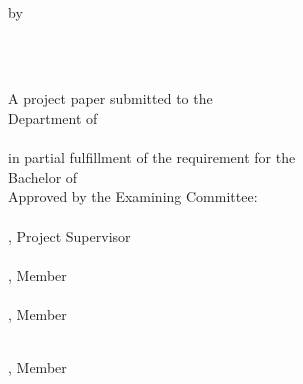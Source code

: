 \documentclass[a4paper]{memoir}
\begin{document}
\thispagestyle{empty}
\begin{LARGE}
\begin{center}

{\fontsize{16pt}{18pt}\selectfont
  \textbf{\myTitle}
}\\[24pt]

{\fontsize{14pt}{16pt}\selectfont
  by

  \vfill
  \myName\\[10pt]
  \MakeTextUppercase{\myMatric}\\

  \vfill

  A project paper submitted to the\\[12pt]
  Department of \myDepartment\\
  \myKulliyyah\\[12pt]


  in partial fulfillment of the requirement for the\\[12pt]
  Bachelor of \mySubject\\[24pt]

  Approved by the Examining Committee:\\[48pt]

  \makebox[3.5in]{\hrulefill}\\
  \mySupervisor, Project Supervisor\\[32pt]

  \makebox[3.5in]{\hrulefill}\\
  \myName, Member\\[32pt]

  \ifx\myPartner\undefined
  \else
  \makebox[3.5in]{\hrulefill}\\
  \myPartner, Member\\[32pt]
  \fi

  \ifx\myPartnerTwo\undefined
  \else
  \makebox[3.5in]{\hrulefill}\\
  \myPartnerTwo, Member\\[32pt]
  \fi

  \vfill

  \myUni\\[24pt]
  \myTime\\
  \mySemester\\
}
\end{center}
\end{LARGE}
\end{document}
